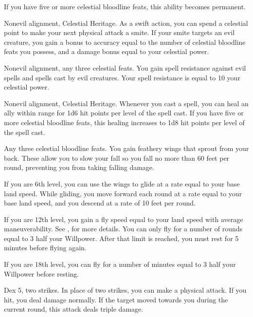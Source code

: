 If you have five or more celestial bloodline feats, this ability becomes permanent.

\featpres Nonevil alignment, Celestial Heritage.
\featben As a swift action, you can spend a celestial point to make your next physical attack a smite.
If your smite targets an evil creature, you gain a bonus to accuracy equal to the number of celestial bloodline feats you possess, and a damage bonus equal to your celestial power.

\featpres Nonevil alignment, any three celestial feats.
\featben You gain spell resistance against evil spells and spells cast by evil creatures.
Your spell resistance is equal to 10 \add your celestial power.

\featpres Nonevil alignment, Celestial Heritage.
\featben Whenever you cast a spell, you can heal an ally within \rngclose range for 1d6 hit points per level of the spell cast.
If you have five or more celestial bloodline feats, this healing increases to 1d8 hit points per level of the spell cast.

\featpre Any three celestial bloodline feats.
\featben You gain feathery wings that sprout from your back.
These allow you to slow your fall so you fall no more than 60 feet per round, preventing you from taking falling damage.

If you are 6th level, you can use the wings to glide at a rate equal to your base land speed.
While gliding, you move forward each round at a rate equal to your base land speed, and you descend at a rate of 10 feet per round.

If you are 12th level, you gain a fly speed equal to your land speed with average maneuverability.
See , for more details.
You can only fly for a number of rounds equal to 3 \add half your Willpower.
After that limit is reached, you must rest for 5 minutes before flying again.

If you are 18th level, you can fly for a number of minutes equal to 3 \add half your Willpower before resting.

\featpre Dex 5, two strikes.
\featben In place of two strikes, you can make a physical attack.
If you hit, you deal damage normally.
If the target moved towards you during the current round, this attack deals triple damage.

